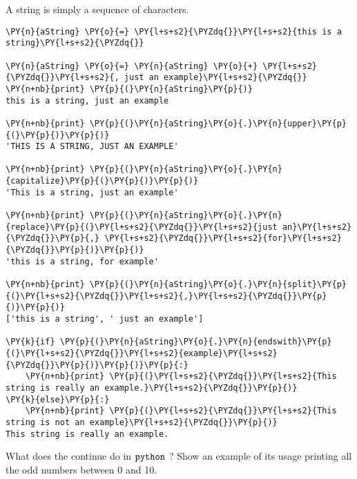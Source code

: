 \begin{Answer}
A string is simply a sequence of characters.

\begin{codebox}[size=fbox, boxrule=1pt, colback=cellbackground, colframe=cellborder]
\begin{Verbatim}[commandchars=\\\{\}]
\PY{n}{aString} \PY{o}{=} \PY{l+s+s2}{\PYZdq{}}\PY{l+s+s2}{this is a string}\PY{l+s+s2}{\PYZdq{}}
  
\PY{n}{aString} \PY{o}{=} \PY{n}{aString} \PY{o}{+} \PY{l+s+s2}{\PYZdq{}}\PY{l+s+s2}{, just an example}\PY{l+s+s2}{\PYZdq{}}
\PY{n+nb}{print} \PY{p}{(}\PY{n}{aString}\PY{p}{)}
this is a string, just an example

\PY{n+nb}{print} \PY{p}{(}\PY{n}{aString}\PY{o}{.}\PY{n}{upper}\PY{p}{(}\PY{p}{)}\PY{p}{)}
'THIS IS A STRING, JUST AN EXAMPLE'

\PY{n+nb}{print} \PY{p}{(}\PY{n}{aString}\PY{o}{.}\PY{n}{capitalize}\PY{p}{(}\PY{p}{)}\PY{p}{)}
'This is a string, just an example'

\PY{n+nb}{print} \PY{p}{(}\PY{n}{aString}\PY{o}{.}\PY{n}{replace}\PY{p}{(}\PY{l+s+s2}{\PYZdq{}}\PY{l+s+s2}{just an}\PY{l+s+s2}{\PYZdq{}}\PY{p}{,} \PY{l+s+s2}{\PYZdq{}}\PY{l+s+s2}{for}\PY{l+s+s2}{\PYZdq{}}\PY{p}{)}\PY{p}{)}
'this is a string, for example'

\PY{n+nb}{print} \PY{p}{(}\PY{n}{aString}\PY{o}{.}\PY{n}{split}\PY{p}{(}\PY{l+s+s2}{\PYZdq{}}\PY{l+s+s2}{,}\PY{l+s+s2}{\PYZdq{}}\PY{p}{)}\PY{p}{)}
['this is a string', ' just an example']

\PY{k}{if} \PY{p}{(}\PY{n}{aString}\PY{o}{.}\PY{n}{endswith}\PY{p}{(}\PY{l+s+s2}{\PYZdq{}}\PY{l+s+s2}{example}\PY{l+s+s2}{\PYZdq{}}\PY{p}{)}\PY{p}{)}\PY{p}{:}
    \PY{n+nb}{print} \PY{p}{(}\PY{l+s+s2}{\PYZdq{}}\PY{l+s+s2}{This string is really an example.}\PY{l+s+s2}{\PYZdq{}}\PY{p}{)}
\PY{k}{else}\PY{p}{:}
    \PY{n+nb}{print} \PY{p}{(}\PY{l+s+s2}{\PYZdq{}}\PY{l+s+s2}{This string is not an example}\PY{l+s+s2}{\PYZdq{}}\PY{p}{)}
This string is really an example.
\end{Verbatim}
\end{codebox}
\end{Answer}

\begin{Exercise}
What does the continue do in \(\tt{python}\) ? Show an example of its usage printing all the odd numbers between 0 and 10.
\end{Exercise}

